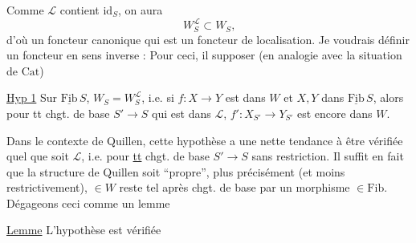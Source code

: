 Comme  $\mathcal L$ contient $\mathrm{id}_S$, on aura
\[
W_S^{\mathcal L}\subset W_S\text{,}
\]
d'où un foncteur canonique
qui est un foncteur de localisation. Je voudrais définir un foncteur en sens inverse : Pour ceci, il   supposer (en analogie avec la situation de $\mathrm{Cat}$)

\uline{Hyp 1} Sur $\underline{\mathrm{Fib}}\,S$, $W_S=W_S^{\mathcal L}$, i.e. si $f:X\longrightarrow Y$ est dans $W$ et $X,Y$ dans $\underline{\mathrm{Fib}}\,S$, alors  pour tt chgt. de base $S'\longrightarrow S$ qui est dans $\mathcal L$, $f':X_{S'}\longrightarrow Y_{S'}$ est encore dans $W$.

Dans le contexte de Quillen, cette hypothèse  a une nette tendance à être vérifiée quel  que soit $\mathcal L$, i.e. pour \uline{tt} chgt. de base $S'\longrightarrow S$ sans restriction. Il suffit en fait que la structure de Quillen soit ``propre'', plus précisément (et moins restrictivement),   $\in W$ reste tel après chgt. de base par un morphisme $\in\mathrm{Fib}$.
Dégageons ceci comme un lemme

\uline{Lemme} L'hypothèse est vérifiée  
